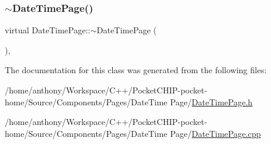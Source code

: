 \mbox{\label{classDateTimePage_a1202f0b3be630059c449f09dc488e5b5}} 
\subsubsection{\texorpdfstring{$\sim$\+Date\+Time\+Page()}{~DateTimePage()}}
{\footnotesize\ttfamily virtual Date\+Time\+Page\+::$\sim$\+Date\+Time\+Page (\begin{DoxyParamCaption}{ }\end{DoxyParamCaption})\hspace{0.3cm}{\ttfamily [inline]}, {\ttfamily [virtual]}}



The documentation for this class was generated from the following files\+:\begin{DoxyCompactItemize}
\item 
/home/anthony/\+Workspace/\+C++/\+Pocket\+C\+H\+I\+P-\/pocket-\/home/\+Source/\+Components/\+Pages/\+Date\+Time Page/\mbox{\hyperlink{DateTimePage_8h}{Date\+Time\+Page.\+h}}\item 
/home/anthony/\+Workspace/\+C++/\+Pocket\+C\+H\+I\+P-\/pocket-\/home/\+Source/\+Components/\+Pages/\+Date\+Time Page/\mbox{\hyperlink{DateTimePage_8cpp}{Date\+Time\+Page.\+cpp}}\end{DoxyCompactItemize}
